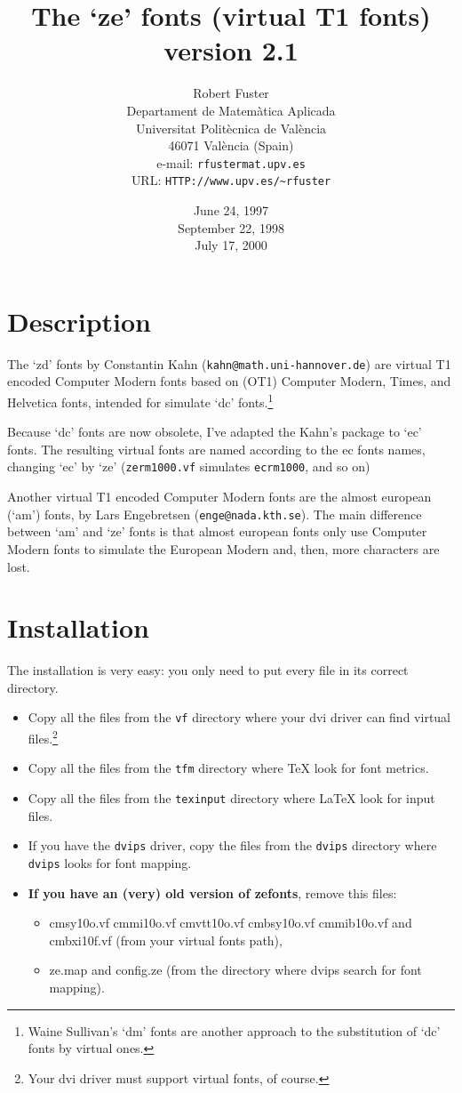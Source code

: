 \documentclass{article}
\title{The `ze' fonts
       (virtual T1 fonts)\\
       version 2.1}
\author{Robert Fuster\\
        \footnotesize Departament de Matem\`atica Aplicada\\
        \footnotesize Universitat Polit\`ecnica de Val\`encia\\
        \footnotesize 46071 Val\`encia (Spain)\\
        \footnotesize e-mail: \texttt{rfuster\@ mat.upv.es}\\
        \footnotesize URL: \texttt{HTTP://www.upv.es/\~{}rfuster}}
\date{\small June 24, 1997\\
      September 22, 1998\\
      July 17, 2000}
\begin{document}
\maketitle
\tableofcontents
\section{Description}
    The `zd' fonts by Constantin Kahn (\verb<kahn@math.uni-hannover.de<)
    are virtual T1 encoded Computer Modern fonts based on (OT1) Computer Modern,
    Times, and Helvetica fonts, intended for simulate `dc'
    fonts.\footnote{Waine Sullivan's `dm' fonts are another approach to
    the substitution of `dc' fonts by virtual ones.}

    Because `dc' fonts are now obsolete, I've adapted the Kahn's package to
    `ec' fonts. The resulting virtual fonts are named according to the ec
    fonts names, changing `ec' by `ze' (\verb+zerm1000.vf+
    simulates \verb+ecrm1000+, and so on)
                             
    Another virtual T1 encoded Computer Modern fonts are the almost european
    (`am') fonts, by Lars Engebretsen (\texttt{enge@nada.kth.se}). The main
    difference between `am' and `ze' fonts is that almost european fonts only
    use Computer Modern fonts to simulate the European Modern and, then,
    more characters are lost.
\section{Installation}
    The installation is very easy: you only need to put every file in its
    correct directory.
    \begin{itemize}
        \item Copy all the files from the \verb+vf+ directory where your
        dvi driver can find virtual files.\footnote{Your dvi driver must
        support virtual fonts, of course.}
        \item Copy all the files from the \verb+tfm+ directory where \TeX{}
        look for font metrics.
        \item Copy all the files from the \verb+texinput+ directory
        where \LaTeX{} look for input files.
        \item If you have the \verb+dvips+ driver, copy the files from the
        \verb+dvips+ directory where \verb+dvips+ looks for font mapping.
        \item \textbf{If you have an (very) old version of zefonts}, remove
        this files:
        \begin{itemize}
              \item  cmsy10o.vf
                     cmmi10o.vf
                     cmvtt10o.vf
                     cmbsy10o.vf
                     cmmib10o.vf and
                     cmbxi10f.vf
                    (from your virtual fonts path),
              \item ze.map and config.ze (from the directory where dvips
              search for font mapping).
        \end{itemize}
    \end{itemize}
\end{document}
